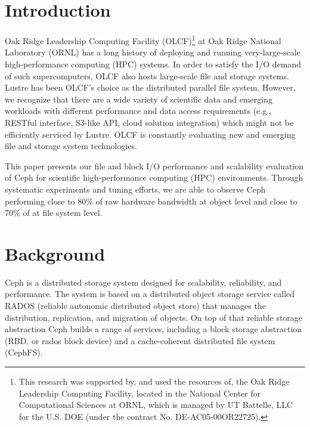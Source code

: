 \section{Introduction}

Oak Ridge Leadership Computing Facility (OLCF)\footnote{This research was
supported by, and used the resources of, the Oak Ridge Leadership Computing
Facility, located in the National Center for Computational Sciences at ORNL,
which is managed by UT Battelle, LLC for the U.S. DOE (under the contract No.
DE-AC05-00OR22725).} at Oak Ridge National Laboratory (ORNL) has a long history
of deploying and running very-large-scale high-performance computing (HPC)
systems. 
In order to satisfy the I/O demand of such supercomputers, OLCF
also hosts large-scale file and storage systems. Lustre has been OLCF's choice
as the distributed parallel file system.  
However, we
recognize that there are a wide variety of scientific data and emerging
workloads with different performance and data access requirements (e.g., RESTful
interface, S3-like API, cloud solution integration) which might not be
efficiently serviced by Lustre. OLCF is constantly evaluating new and emerging
file and storage system technologies.  

This paper presents our file and block I/O performance and scalability
evaluation of Ceph for scientific high-performance computing (HPC)
environments. Through systematic experiments and tuning efforts, we are able
to observe Ceph performing close to 80\% of raw hardware bandwidth at object
level and close to 70\% of at file system level.


\section{Background}

Ceph\cite{Weil:2006:Ceph} is a distributed storage system designed for
scalability, reliability, and performance.  The system is based on a
distributed object storage service called RADOS (reliable autonomic distributed
object store) that manages the distribution, replication, and migration of
objects.  On top of that reliable storage abstraction Ceph builds a range of
services, including a block storage abstraction (RBD, or rados block device)
and a cache-coherent distributed file system (CephFS).

